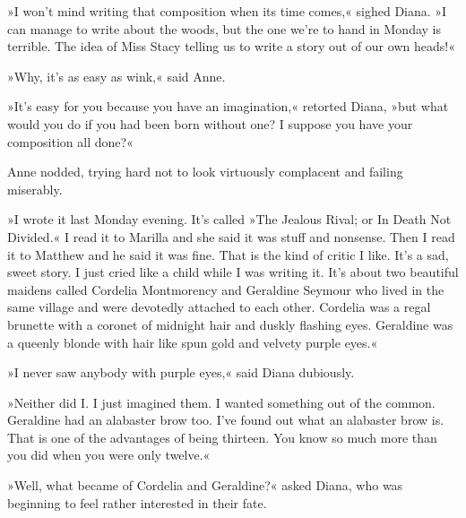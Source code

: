 »I won't mind writing that composition when its time comes,« sighed Diana. »I can manage to write about the woods, but the one we're to hand in Monday is terrible. The idea of Miss Stacy telling us to write a story out of our own heads!«

»Why, it's as easy as wink,« said Anne.

»It's easy for you because you have an imagination,« retorted Diana, »but what would you do if you had been born without one? I suppose you have your composition all done?«

Anne nodded, trying hard not to look virtuously complacent and failing miserably.

»I wrote it last Monday evening. It's called »The Jealous Rival; or In Death Not Divided.« I read it to Marilla and she said it was stuff and nonsense. Then I read it to Matthew and he said it was fine. That is the kind of critic I like. It's a sad, sweet story. I just cried like a child while I was writing it. It's about two beautiful maidens called Cordelia Montmorency and Geraldine Seymour who lived in the same village and were devotedly attached to each other. Cordelia was a regal brunette with a coronet of midnight hair and duskly flashing eyes. Geraldine was a queenly blonde with hair like spun gold and velvety purple eyes.«

»I never saw anybody with purple eyes,« said Diana dubiously.

»Neither did I. I just imagined them. I wanted something out of the common. Geraldine had an alabaster brow too. I've found out what an alabaster brow is. That is one of the advantages of being thirteen. You know so much more than you did when you were only twelve.«

»Well, what became of Cordelia and Geraldine?« asked Diana, who was beginning to feel rather interested in their fate.

